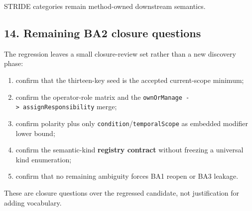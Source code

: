 \documentclass[
  10pt,
  a4paper,
]{article}
\providecommand{\tightlist}{%
  \setlength{\itemsep}{0pt}\setlength{\parskip}{0pt}}
\begin{document}
STRIDE categories remain method-owned downstream semantics.

\subsection{14. Remaining BA2 closure
questions}\label{14-remaining-ba2-closure-questions}

The regression leaves a small closure-review set rather than a new
discovery phase:

\begin{enumerate}
\def\labelenumi{\arabic{enumi}.}
\tightlist
\item
  confirm that the thirteen-key seed is the accepted current-scope
  minimum;
\item
  confirm the operator-role matrix and the
  \texttt{ownOrManage\ -\textgreater{}\ assignResponsibility} merge;
\item
  confirm polarity plus only \texttt{condition}/\texttt{temporalScope}
  as embedded modifier lower bound;
\item
  confirm the semantic-kind \textbf{registry contract} without freezing
  a universal kind enumeration;
\item
  confirm that no remaining ambiguity forces BA1 reopen or BA3 leakage.
\end{enumerate}

These are closure questions over the regressed candidate, not
justification for adding vocabulary.
\end{document}
